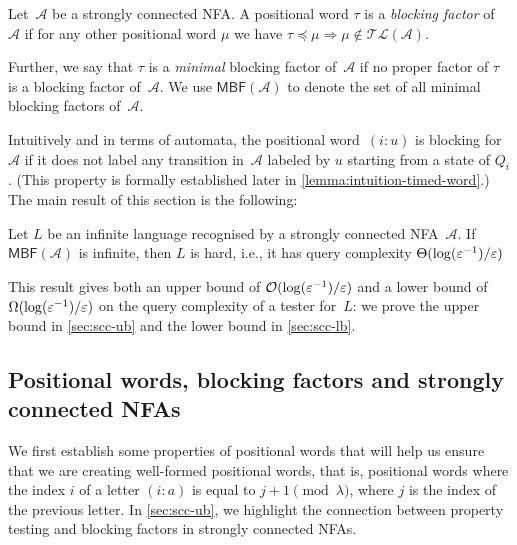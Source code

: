\documentclass[letterpaper, USenglish, cleveref, autoref, thm-restate, numberwithinsect]{lipics-v2021}
\theoremstyle{theorem}
\theoremstyle{definition}
\newcommand{\Aa}{\mathcal{A}}
\newcommand{\cO}{\mathcal{O}}
\newcommand{\eps}{\varepsilon}
\newcommand{\factor}{\preccurlyeq}
\newcommand{\MBF}{\textsf{MBF}\xspace}
\newcommand{\timedlang}[1]{\mathcal{TL}( #1 )}
\newcommand{\timedword}[2]{(#1:#2)}
\newcommand{\epslogeps}[1][]
{\ifthenelse{\equal{#1}{}}{\log(\eps^{-1})/\eps}{\log^{ #1 }(\eps^{-1})/\eps}}
\begin{document}
\begin{definition}\label{def:blocking}
    Let~$\Aa$ be a strongly connected NFA.
    A positional word $\tau$ is a \emph{blocking factor} of~$\Aa$
    if for any other positional word $\mu$
    we have $\tau \factor \mu \Rightarrow \mu \notin \timedlang{\Aa}$.

    Further, we say that $\tau$ is a \emph{minimal} blocking factor of~$\Aa$ 
    if no proper factor of $\tau$ is a blocking factor of~$\Aa$.
    We use $\MBF(\Aa)$ to denote the set of all minimal blocking factors of~$\Aa$.
\end{definition}
Intuitively and in terms of automata, the positional word~$\timedword{i}{u}$ is blocking for~$\Aa$ if it does not label any transition in~$\Aa$ labeled by $u$ starting from a state of $Q_i$. (This property is formally established later in \cref{lemma:intuition-timed-word}.)
The main result of this section is the following:
\begin{theorem}\label{thm:scc}
    Let $L$ be an infinite language recognised by a strongly connected NFA~$\Aa$. If $\MBF(\Aa)$ is infinite, then $L$ is hard, i.e., it has query complexity $\Theta(\epslogeps)$
\end{theorem}
This result gives both an upper bound of $\cO(\epslogeps)$ and a lower bound of $\Omega(\epslogeps)$ on the query complexity of a tester for~$L$:
we prove the upper bound in \cref{sec:scc-ub} and the lower bound in \cref{sec:scc-lb}.

\subsection{Positional words, blocking factors and strongly connected NFAs}\label{sec:scc-tw}

We first establish some properties of positional words that will help us ensure that we are creating well-formed positional words, that is, positional words where the index $i$ of a letter $\timedword{i}{a}$ is equal to $j+1\pmod{\lambda}$, where $j$ is the index of the previous letter. In \cref{sec:scc-ub}, we highlight the connection between property testing and blocking factors in strongly connected NFAs.
\end{document}
